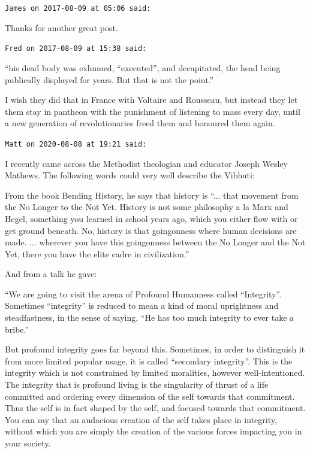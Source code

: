 \begin{footnotesize}
\begin{sffamily}
\texttt{James on 2017-08-09 at 05:06 said:}

Thanks for another great post.

\hfill

\texttt{Fred on 2017-08-09 at 15:38 said:}

``his dead body was exhumed, ``executed'', and decapitated, the head being publically displayed for years. But that is not the point.''

I wish they did that in France with Voltaire and Rousseau, but instead they let them stay in pantheon with the punishment of listening to mass every day, until a new generation of revolutionaries freed them and honoured them again.

\hfill

\texttt{Matt on 2020-08-08 at 19:21 said:}

I recently came across the Methodist theologian and educator Joseph Wesley Mathews. The following words could very well describe the Vibhuti:

From the book Bending History, he says that history is ``... that movement from the No Longer to the Not Yet. History is not some philosophy a la Marx and Hegel, something you learned in school years ago, which you either flow with or get ground beneath. No, history is that goingonness where human decisions are made. ... wherever you have this goingonness between the No Longer and the Not Yet, there you have the elite cadre in civilization.''

And from a talk he gave:

``We are going to visit the arena of Profound Humanness called ``Integrity''. Sometimes ``integrity'' is reduced to mean a kind of moral uprightness and steadfastness, in the sense of saying, ``He has too much integrity to ever take a bribe.''

But profound integrity goes far beyond this. Sometimes, in order to distinguish it from more limited popular usage, it is called ``secondary integrity''. This is the integrity which is not constrained by limited moralities, however well-intentioned. The integrity that is profound living is the singularity of thrust of a life committed and ordering every dimension of the self towards that commitment. Thus the self is in fact shaped by the self, and focused towards that commitment. You can say that an audacious creation of the self takes place in integrity, without which you are simply the creation of the various forces impacting you in your society.


\end{sffamily}
\end{footnotesize}
